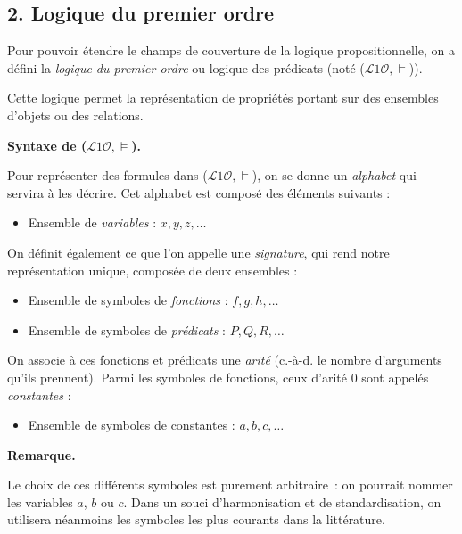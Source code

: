 \documentclass[11pt]{article}
\newenvironment{remarque}{%
    \begin{mdframed}[
        linecolor=sectioncolor!40,
        linewidth=0.8pt,
        backgroundcolor=sectioncolor!5,
        innerleftmargin=10pt,
        innerrightmargin=10pt,
        innertopmargin=6pt,
        innerbottommargin=6pt,
        skipabove=8pt,
        skipbelow=8pt
    ]
    \noindent\textbf{\small\color{sectioncolor}Remarque.}\enspace\small\itshape
}{%
    \end{mdframed}
}
\begin{document}
\newpage

\subsection*{2. Logique du premier ordre}
\label{lpo}
\vspace{0.4cm}

Pour pouvoir étendre le champs de couverture de la logique propositionnelle, on a défini la \textit{logique du premier ordre} ou logique des prédicats (noté ($\mathcal{L}1\mathcal{O}, \models$)).

Cette logique permet la représentation de propriétés portant sur des ensembles d'objets ou des relations.



\vspace{0.4cm}
\noindent\textbf{Syntaxe de ($\mathcal{L}1\mathcal{O}, \models$).}
\vspace{0.2cm}

Pour représenter des formules dans ($\mathcal{L}1\mathcal{O}, \models$), on se donne un
\textit{alphabet} qui servira à les décrire. Cet alphabet est composé des éléments suivants :
\begin{itemize}
    \item Ensemble de \textit{variables} : $x, y, z, \ldots$
\end{itemize}
On définit également ce que l'on appelle une \textit{signature}, qui rend notre représentation
unique, composée de deux ensembles :
\begin{itemize}
    \item Ensemble de symboles de \textit{fonctions} : $f, g, h, \ldots$
    \item Ensemble de symboles de \textit{prédicats} : $P, Q, R, \ldots$
\end{itemize}
On associe à ces fonctions et prédicats une \textit{arité} (c.-à-d. le nombre d'arguments
qu'ils prennent). Parmi les symboles de fonctions, ceux d'arité $0$ sont appelés
\textit{constantes} :
\begin{itemize}
    \item Ensemble de symboles de constantes : $a, b, c, \ldots$
\end{itemize}
\begin{remarque}
    Le choix de ces différents symboles est purement arbitraire~: on pourrait nommer les
    variables $a$, $b$ ou $c$. Dans un souci d'harmonisation et de standardisation, on
    utilisera néanmoins les symboles les plus courants dans la littérature.
\end{remarque}
\vspace{0.2cm}
\end{document}
